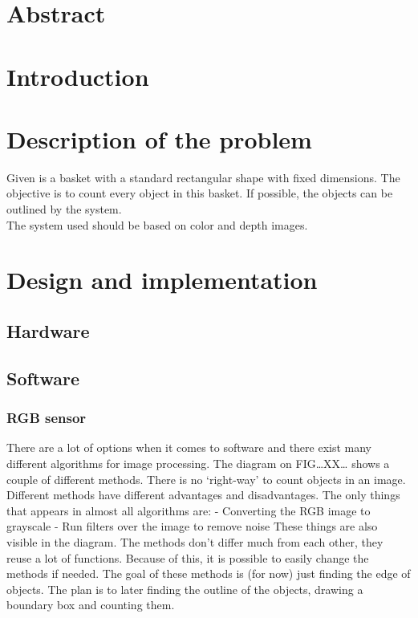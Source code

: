 \documentclass{article}
\begin{document}


\section*{Abstract}
\thispagestyle{empty}

\newpage
\tableofcontents
\thispagestyle{empty}

\newpage
\listoftables
\thispagestyle{empty}

\newpage
\listoffigures
\thispagestyle{empty}

\newpage
\section{Introduction}

\section{Description of the problem}

\hspace{\parindent} Given is a basket with a standard rectangular shape with fixed dimensions. The objective is to count every object in this basket. If possible, the objects can be outlined by the system.\\

\noindent The system used should be based on color and depth images.


\section{Design and implementation}
\subsection{Hardware}
\subsection{Software}
\subsubsection{RGB sensor}

There are a lot of options when it comes to software and there exist many different algorithms for image processing. The diagram on FIG…XX… shows a couple of different methods. There is no ‘right-way’ to count objects in an image. Different methods have different advantages and disadvantages. The only things that appears in almost all algorithms are:
-	Converting the RGB image to grayscale
-	Run filters over the image to remove noise
These things are also visible in the diagram. The methods don't differ much from each other, they reuse a lot of functions. Because of this, it is possible to easily change the methods if needed. The goal of these methods is (for now) just finding the edge of objects. The plan is to later finding the outline of the objects, drawing a boundary box and counting them.  
\end{document}
